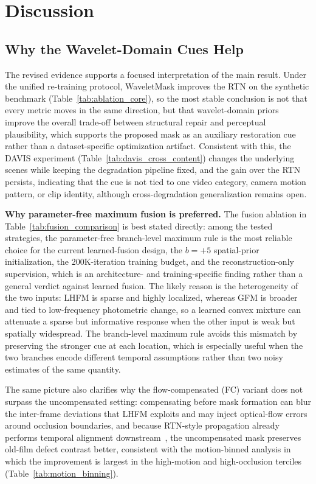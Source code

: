 \section{Discussion}\label{sec:discussion}

\subsection{Why the Wavelet-Domain Cues Help}\label{subsec:fusion_insight}\label{subsec:freq_complement}\label{subsec:wavelet_choice}

The revised evidence supports a focused interpretation of the main result. Under the unified re-training protocol, WaveletMask improves the RTN on the synthetic benchmark (Table~\ref{tab:ablation_core}), so the most stable conclusion is not that every metric moves in the same direction, but that wavelet-domain priors improve the overall trade-off between structural repair and perceptual plausibility, which supports the proposed mask as an auxiliary restoration cue rather than a dataset-specific optimization artifact. Consistent with this, the DAVIS experiment (Table~\ref{tab:davis_cross_content}) changes the underlying scenes while keeping the degradation pipeline fixed, and the gain over the RTN persists, indicating that the cue is not tied to one video category, camera motion pattern, or clip identity, although cross-degradation generalization remains open.

\textbf{Why parameter-free maximum fusion is preferred.}
The fusion ablation in Table~\ref{tab:fusion_comparison} is best stated directly: among the tested strategies, the parameter-free branch-level maximum rule is the most reliable choice for the current learned-fusion design, the $b=+5$ spatial-prior initialization, the 200K-iteration training budget, and the reconstruction-only supervision, which is an architecture- and training-specific finding rather than a general verdict against learned fusion. The likely reason is the heterogeneity of the two inputs: LHFM is sparse and highly localized, whereas GFM is broader and tied to low-frequency photometric change, so a learned convex mixture can attenuate a sparse but informative response when the other input is weak but spatially widespread. The branch-level maximum rule avoids this mismatch by preserving the stronger cue at each location, which is especially useful when the two branches encode different temporal assumptions rather than two noisy estimates of the same quantity.

The same picture also clarifies why the flow-compensated (FC) variant does not surpass the uncompensated setting: compensating before mask formation can blur the inter-frame deviations that LHFM exploits and may inject optical-flow errors around occlusion boundaries, and because RTN-style propagation already performs temporal alignment downstream~\cite{rtn2022,rrtn2024}, the uncompensated mask preserves old-film defect contrast better, consistent with the motion-binned analysis in which the improvement is largest in the high-motion and high-occlusion terciles (Table~\ref{tab:motion_binning}).

